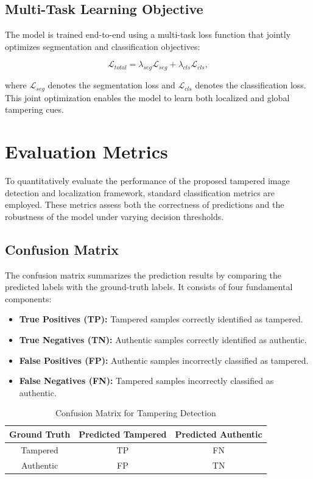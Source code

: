 \documentclass[12pt]{article}
\begin{document}
\subsection{Multi-Task Learning Objective}

The model is trained end-to-end using a multi-task loss function that jointly optimizes segmentation and classification objectives:

\[
    \mathcal{L}_{total} = \lambda_{seg}\mathcal{L}_{seg} + \lambda_{cls}\mathcal{L}_{cls},
\]

where $\mathcal{L}_{seg}$ denotes the segmentation loss and $\mathcal{L}_{cls}$ denotes the classification loss. This joint optimization enables the model to learn both localized and global tampering cues.


\section{Evaluation Metrics}

To quantitatively evaluate the performance of the proposed tampered image detection
and localization framework, standard classification metrics are employed. These
metrics assess both the correctness of predictions and the robustness of the model
under varying decision thresholds.

\subsection{Confusion Matrix}

The confusion matrix summarizes the prediction results by comparing the predicted
labels with the ground-truth labels. It consists of four fundamental components:

\begin{itemize}
    \item \textbf{True Positives (TP):} Tampered samples correctly identified as tampered.
    \item \textbf{True Negatives (TN):} Authentic samples correctly identified as authentic.
    \item \textbf{False Positives (FP):} Authentic samples incorrectly classified as tampered.
    \item \textbf{False Negatives (FN):} Tampered samples incorrectly classified as authentic.
\end{itemize}

\begin{table}[h]
    \centering
    \caption{Confusion Matrix for Tampering Detection}
    \begin{tabular}{c|c|c}
        \hline
        \textbf{Ground Truth} & \textbf{Predicted Tampered} & \textbf{Predicted Authentic} \\
        \hline
        Tampered              & TP                          & FN                           \\
        Authentic             & FP                          & TN                           \\
        \hline
    \end{tabular}
\end{table}
\end{document}
